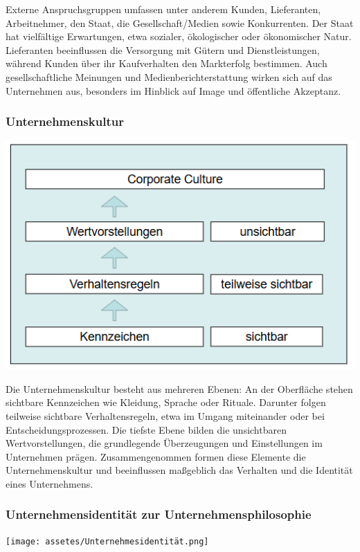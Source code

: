 \documentclass[]{article}
\begin{document}
Externe Anspruchsgruppen umfassen unter anderem Kunden, Lieferanten, Arbeitnehmer, den Staat, die Gesellschaft/Medien sowie Konkurrenten. Der Staat hat vielfältige Erwartungen, etwa sozialer, ökologischer oder ökonomischer Natur. Lieferanten beeinflussen die Versorgung mit Gütern und Dienstleistungen, während Kunden über ihr Kaufverhalten den Markterfolg bestimmen. Auch gesellschaftliche Meinungen und Medienberichterstattung wirken sich auf das Unternehmen aus, besonders im Hinblick auf Image und öffentliche Akzeptanz.


\subsubsection{Unternehmenskultur}

\includegraphics[width=\linewidth*2/3]{assetes/Unternehmeskultur.png}

Die Unternehmenskultur besteht aus mehreren Ebenen: An der Oberfläche stehen sichtbare Kennzeichen wie Kleidung, Sprache oder Rituale. Darunter folgen teilweise sichtbare Verhaltensregeln, etwa im Umgang miteinander oder bei Entscheidungsprozessen. Die tiefste Ebene bilden die unsichtbaren Wertvorstellungen, die grundlegende Überzeugungen und Einstellungen im Unternehmen prägen. Zusammengenommen formen diese Elemente die Unternehmenskultur und beeinflussen maßgeblich das Verhalten und die Identität eines Unternehmens.

\subsubsection{Unternehmensidentität zur Unternehmensphilosophie}

\texttt{[image: assetes/Unternehmesidentität.png]}
\end{document}
